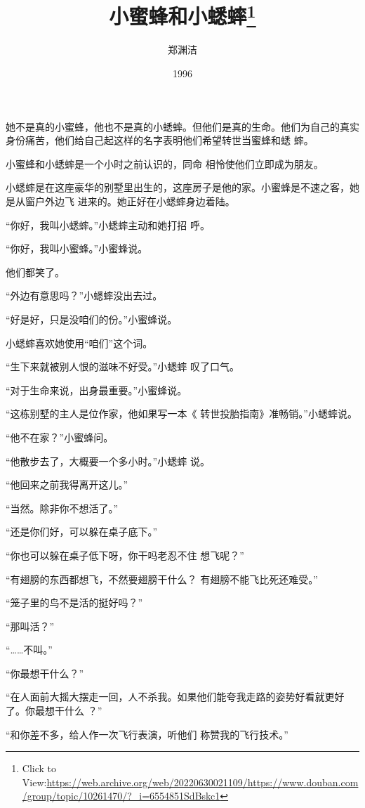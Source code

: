 \documentclass{article}
\title{小蜜蜂和小蟋蟀\footnote{Click to View:\url{https://web.archive.org/web/20220630021109/https://www.douban.com/group/topic/10261470/?_i=6554851SdBskc1}}}
\author{郑渊洁}
\date{1996}
\begin{document}

\maketitle


\Large

﻿她不是真的小蜜蜂，他也不是真的小蟋蟀。但他们是真的生命。他们为自己的真实身份痛苦，他们给自己起这样的名字表明他们希望转世当蜜蜂和蟋
蟀。 

小蜜蜂和小蟋蟀是一个小时之前认识的，同命
相怜使他们立即成为朋友。 

小蟋蟀是在这座豪华的别墅里出生的，这座房子是他的家。小蜜蜂是不速之客，她是从窗户外边飞
进来的。她正好在小蟋蟀身边着陆。 

“你好，我叫小蟋蟀。”小蟋蟀主动和她打招
呼。 

\newpage


“你好，我叫小蜜蜂。”小蜜蜂说。 


他们都笑了。 


“外边有意思吗？”小蟋蟀没出去过。 


“好是好，只是没咱们的份。”小蜜蜂说。 


小蟋蟀喜欢她使用“咱们”这个词。 

“生下来就被别人恨的滋味不好受。”小蟋蟀
叹了口气。 

“对于生命来说，出身最重要。”小蜜蜂说。
 

“这栋别墅的主人是位作家，他如果写一本《
转世投胎指南》准畅销。”小蟋蟀说。 


“他不在家？”小蜜蜂问。 

\newpage

“他散步去了，大概要一个多小时。”小蟋蟀
说。 


“他回来之前我得离开这儿。” 


“当然。除非你不想活了。” 


“还是你们好，可以躲在桌子底下。” 

“你也可以躲在桌子低下呀，你干吗老忍不住
想飞呢？” 

“有翅膀的东西都想飞，不然要翅膀干什么？
有翅膀不能飞比死还难受。” 


“笼子里的鸟不是活的挺好吗？” 


“那叫活？” 


“……不叫。” 

\newpage


“你最想干什么？” 

“在人面前大摇大摆走一回，人不杀我。如果他们能夸我走路的姿势好看就更好了。你最想干什么
？” 

“和你差不多，给人作一次飞行表演，听他们
称赞我的飞行技术。” 
\end{document}
